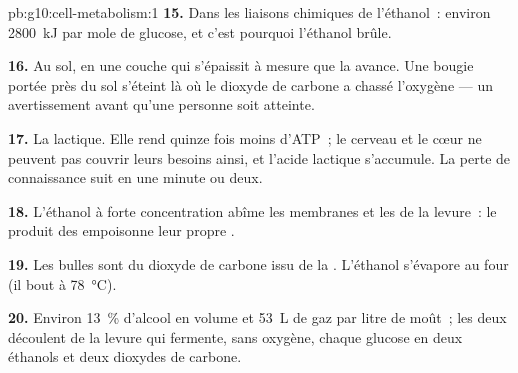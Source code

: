 \begin{solution}{pb:g10:cell-metabolism:1}
\textbf{15.} Dans les liaisons chimiques de l'éthanol~: environ
\qty{2800}{kJ} par mole de glucose, et c'est pourquoi l'éthanol brûle.

\textbf{16.} Au sol, en une couche qui s'épaissit à mesure que la
 avance. Une bougie portée près du sol s'éteint là où le
dioxyde de carbone a chassé l'oxygène --- un avertissement avant
qu'une personne soit atteinte.

\textbf{17.} La  lactique. Elle rend quinze fois moins
d'ATP~; le cerveau et le cœur ne peuvent pas couvrir leurs besoins
ainsi, et l'acide lactique s'accumule. La perte de connaissance suit en
une minute ou deux.

\textbf{18.} L'éthanol à forte concentration abîme les membranes et les
 de la levure~: le produit des  empoisonne leur propre
.

\textbf{19.} Les bulles sont du dioxyde de carbone issu de la
. L'éthanol s'évapore au four (il bout à
\qty{78}{\celsius}).

\textbf{20.} Environ 13~\% d'alcool en volume et \qty{53}{L} de gaz par
litre de moût~; les deux découlent de la levure qui fermente, sans
oxygène, chaque glucose en deux éthanols et deux dioxydes de carbone.
\end{solution}
